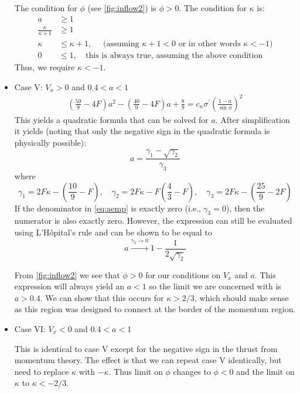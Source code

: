 \begin{itemize}
The condition for $\phi$ (see \cref{fig:inflow2}) is $\phi > 0$.  The condition for $\kappa$ is:
\begin{equation}
    \begin{aligned}
        a &\ge 1\\
        \frac{\kappa}{\kappa + 1} &\ge 1\\
        \kappa &\le \kappa + 1,\quad \text{ (assuming $\kappa + 1 < 0$ or in other words $\kappa < -1$)} \\
        0 &\le 1,\quad \text{this is always true, assuming the above condition}
    \end{aligned}
\end{equation}
Thus, we require $\kappa < -1$.

\item Case V: $V_x > 0$ and $0.4 < a < 1$
\begin{equation}
\begin{aligned}
\left(\frac{50}{9} - 4F\right) a^2 - \left(\frac{40}{9} - 4F\right) a + \frac{8}{9} = c_n \sigma^\prime \left(\frac{1-a}{\sin\phi}\right)^2
\end{aligned}
\end{equation}
This yields a quadratic formula that can be solved for $a$.  After simplification it yields (noting that only the negative sign in the quadratic formula is physically possible):
\begin{equation}
a = \frac{\gamma_1 - \sqrt{\gamma_2}}{\gamma_3}
\label{eq:aemp}
\end{equation}
where
\begin{equation}
\gamma_1 = 2F\kappa - \left(\frac{10}{9} - F\right)\!, \quad \gamma_2 = 2F\kappa - F\left(\frac{4}{3} - F\right)\!,\quad
\gamma_3 = 2F\kappa - \left(\frac{25}{9} - 2F\right)
\label{eq:gamma}
\end{equation}
If the denominator in \cref{eq:aemp} is exactly zero (i.e., $\gamma_3 = 0$), then the numerator is also exactly zero.  However, the expression can still be evaluated using L'H\^{o}pital's rule and can be shown to be equal to
\begin{equation}
    a \xrightarrow{\gamma_3 \to 0} 1 - \frac{1}{2\sqrt{\gamma_2}}
    \label{eq:aconverge}
\end{equation}

From \cref{fig:inflow2} we see that $\phi > 0$ for our conditions on $V_x$ and $a$.  This expression will always yield an $a < 1$ so the limit we are concerned with is $a > 0.4$.  We can show that this occurs for $\kappa > 2/3$, which should make sense as this region was designed to connect at the border of the momentum region.


\item Case VI: $V_x < 0$ and $0.4 < a < 1$

This is identical to case V except for the negative sign in the thrust from momentum theory.  The effect is that we can repeat case V identically, but need to replace $\kappa$ with $-\kappa$.  Thus limit on $\phi$ changes to $\phi < 0$ and the limit on $\kappa$ to $\kappa < -2/3$.

\end{itemize}

